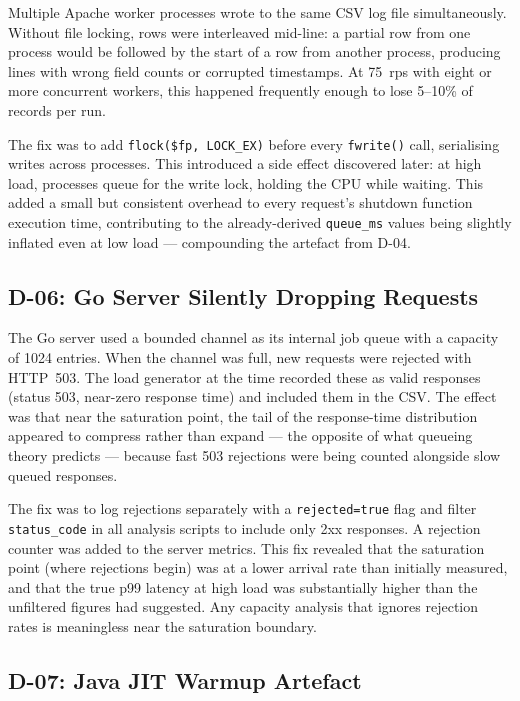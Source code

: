 Multiple Apache worker processes wrote to the same CSV log file simultaneously. Without file locking, rows were interleaved mid-line: a partial row from one process would be followed by the start of a row from another process, producing lines with wrong field counts or corrupted timestamps. At 75~rps with eight or more concurrent workers, this happened frequently enough to lose 5--10\% of records per run.

The fix was to add \texttt{flock(\$fp, LOCK\_EX)} before every \texttt{fwrite()} call, serialising writes across processes. This introduced a side effect discovered later: at high load, processes queue for the write lock, holding the CPU while waiting. This added a small but consistent overhead to every request's shutdown function execution time, contributing to the already-derived \texttt{queue\_ms} values being slightly inflated even at low load — compounding the artefact from D-04.

\subsection{D-06: Go Server Silently Dropping Requests}

The Go server used a bounded channel as its internal job queue with a capacity of 1024 entries. When the channel was full, new requests were rejected with HTTP~503. The load generator at the time recorded these as valid responses (status 503, near-zero response time) and included them in the CSV. The effect was that near the saturation point, the tail of the response-time distribution appeared to compress rather than expand — the opposite of what queueing theory predicts — because fast 503 rejections were being counted alongside slow queued responses.

The fix was to log rejections separately with a \texttt{rejected=true} flag and filter \texttt{status\_code} in all analysis scripts to include only 2xx responses. A rejection counter was added to the server metrics. This fix revealed that the saturation point (where rejections begin) was at a lower arrival rate than initially measured, and that the true p99 latency at high load was substantially higher than the unfiltered figures had suggested. Any capacity analysis that ignores rejection rates is meaningless near the saturation boundary.

\subsection{D-07: Java JIT Warmup Artefact}

